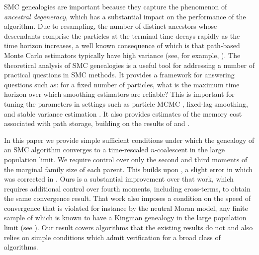 \documentclass{article} %
\theoremstyle{definition}
\newcommand{\1}[1]{\mathbbm{1}_{\{#1\}}}
\begin{document}
SMC genealogies are important because they capture the phenomenon of \emph{ancestral degeneracy}, which has a substantial impact on the performance of the algorithm.  Due to resampling, the number of distinct ancestors whose descendants comprise the particles at the terminal time decays rapidly as the time horizon increases, a well known consequence of which is that path-based Monte Carlo estimators typically have high variance (see, for example, \cite{briers10,fearnhead18}).
The theoretical analysis of SMC genealogies is a useful tool for addressing a number of practical questions in SMC methods. It provides a framework for answering questions such as: for a fixed number of particles, what is the maximum time horizon over which smoothing estimators are reliable? This is important for tuning the parameters in settings such as particle MCMC \cite{andrieu2010}, fixed-lag smoothing, and stable variance estimation \cite{olsson2019}. It also provides estimates of the memory cost associated with path storage, building on the results of \cite{jacob2015} and \cite[Corollary 2]{koskela2018}.

In this paper we provide simple sufficient conditions under which the genealogy of an SMC algorithm converges to a time-rescaled $n$-coalescent \cite{kingman1982coal} in the large population limit. We require control over only the second and third moments of the marginal family size of each parent. 
This builds upon \cite{koskela2020annals}, a slight error in which was corrected in \cite{koskela2018}.
Ours is a substantial improvement over that work, which requires additional control over fourth moments, including cross-terms, to obtain the same convergence result. That work also imposes a condition on the speed of convergence that is violated for instance by the neutral Moran model, any finite sample of which is known to have a Kingman genealogy in the large population limit (see \cite[p47]{durrett2008}). Our result covers algorithms that the existing results do not and also relies on simple conditions which admit verification for a broad class of algorithms.
\end{document}

